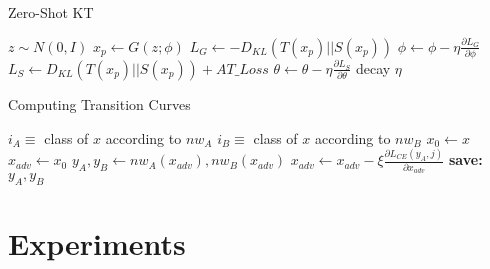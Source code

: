 \documentclass{article}
\begin{document}
\begin{minipage}{0.44\textwidth}
\begin{algorithm}[H]
    \centering
    \caption{Zero-Shot KT}\label{algorithm1}
    \begin{algorithmic}[1]
        \State {}
        \State {}
        \State {}
            \State $z\sim N(0,I)$
                \State $x_p \gets G(z;\phi)$
                \State $L_G \gets -D_{KL}(T(x_p) || S(x_p))$
                \State $\phi \gets \phi-\eta\frac{\partial L_G}{\partial \phi}$
            \EndFor
            \State $L_S \gets D_{KL}(T(x_p) || S(x_p)) + AT\_Loss$
            \State $\theta \gets \theta-\eta\frac{\partial L_S}{\partial \theta}$
            \EndFor
            \State decay $\eta$
        \EndFor
    \end{algorithmic}
\end{algorithm}
\end{minipage}
\hfill
\begin{minipage}{0.55\textwidth}
\begin{algorithm}[H]
    \centering
    \caption{Computing Transition Curves}\label{algorithm2}
    \begin{algorithmic}[1]
        \State {}
        \State {}

        \State $i_A\equiv$ class of $x$ according to $nw_A$
        \State $i_B\equiv$ class of $x$ according to $nw_B$
            \State $x_0 \gets x$
                \State $x_{adv} \gets x_0$
                    \State$y_A, y_B\gets nw_A(x_{adv}),nw_B(x_{adv})$
                    \State $x_{adv} \gets x_{adv}-\xi\frac{\partial L_{CE}(y_A,j)}{\partial x_{adv}}$
                    \State \textbf{save:} $y_A,y_B$
                    \EndFor
                \EndFor
            \EndIf
        \EndFor
    \end{algorithmic}
\end{algorithm}
\end{minipage}


\section{Experiments}\label{exp}
\end{document}
